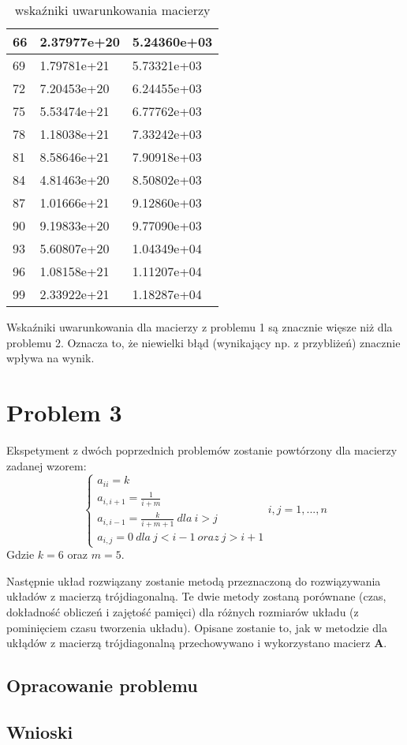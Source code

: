 \documentclass{article}
\begin{document}
\begin{table}[H]
\begin{tabular}{|l|l|l|}
66 & 2.37977e+20 & 5.24360e+03 \\ \hline
69 & 1.79781e+21 & 5.73321e+03 \\ \hline
72 & 7.20453e+20 & 6.24455e+03 \\ \hline
75 & 5.53474e+21 & 6.77762e+03 \\ \hline
78 & 1.18038e+21 & 7.33242e+03 \\ \hline
81 & 8.58646e+21 & 7.90918e+03 \\ \hline
84 & 4.81463e+20 & 8.50802e+03 \\ \hline
87 & 1.01666e+21 & 9.12860e+03 \\ \hline
90 & 9.19833e+20 & 9.77090e+03 \\ \hline
93 & 5.60807e+20 & 1.04349e+04 \\ \hline
96 & 1.08158e+21 & 1.11207e+04 \\ \hline
99 & 2.33922e+21 & 1.18287e+04 \\ \hline
\end{tabular}
\caption{wskaźniki uwarunkowania macierzy}
\end{table}

Wskaźniki uwarunkowania dla macierzy z problemu 1 są znacznie więsze niż dla problemu 2.
Oznacza to, że niewielki błąd (wynikający np. z przybliżeń) znacznie wpływa na wynik.

\section{Problem 3}
Ekspetyment z dwóch poprzednich problemów zostanie powtórzony dla macierzy zadanej wzorem:
$$
\begin{cases}
    a_{ii}=k\\
    a_{i,i+1}=\frac{1}{i+m}\\
    a_{i,i-1}=\frac{k}{i+m+1} \ dla \ i > j\\
    a_{i,j}=0 \ dla \ j<i-1 \ oraz \ j>i+1
\end{cases}i,j=1,...,n
$$
Gdzie $k=6$ oraz $m=5$.

Następnie układ rozwiązany zostanie metodą przeznaczoną do rozwiązywania układów z macierzą trójdiagonalną. Te dwie metody
zostaną porównane (czas, dokładność obliczeń i zajętość pamięci) dla różnych rozmiarów układu (z pominięciem czasu tworzenia
układu). Opisane zostanie to, jak w metodzie dla ukłądów z macierzą trójdiagonalną przechowywano i wykorzystano macierz \textbf{A}.

\subsection{Opracowanie problemu}

\subsection{Wnioski}
\end{document}
